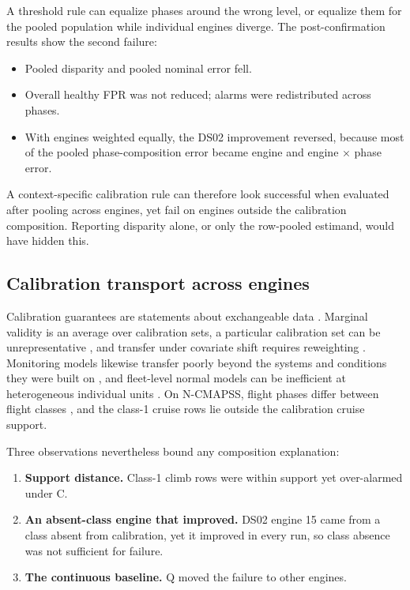 \documentclass[preprint,11pt,a4paper]{elsarticle}
\begin{document}
A threshold rule can equalize phases around the wrong level, or equalize them for the pooled population while individual engines diverge. The post-confirmation results show the second failure:
\begin{itemize}
\item Pooled disparity and pooled nominal error fell.
\item Overall healthy FPR was not reduced; alarms were redistributed across phases.
\item With engines weighted equally, the DS02 improvement reversed, because most of the pooled phase-composition error became engine and engine × phase error.
\end{itemize}

A context-specific calibration rule can therefore look successful when evaluated after pooling across engines, yet fail on engines outside the calibration composition. Reporting disparity alone, or only the row-pooled estimand, would have hidden this.

\subsection{Calibration transport across engines}

Calibration guarantees are statements about exchangeable data \cite{N20}. Marginal validity is an average over calibration sets, a particular calibration set can be unrepresentative \cite{N16}, and transfer under covariate shift requires reweighting \cite{N30}. Monitoring models likewise transfer poorly beyond the systems and conditions they were built on \cite{N21}, and fleet-level normal models can be inefficient at heterogeneous individual units \cite{N44}. On N-CMAPSS, flight phases differ between flight classes \cite{N28}, and the class-1 cruise rows lie outside the calibration cruise support.

Three observations nevertheless bound any composition explanation:
\begin{enumerate}
\item \textbf{Support distance.} Class-1 climb rows were within support yet over-alarmed under C.
\item \textbf{An absent-class engine that improved.} DS02 engine 15 came from a class absent from calibration, yet it improved in every run, so class absence was not sufficient for failure.
\item \textbf{The continuous baseline.} Q moved the failure to other engines.
\end{enumerate}
\end{document}
